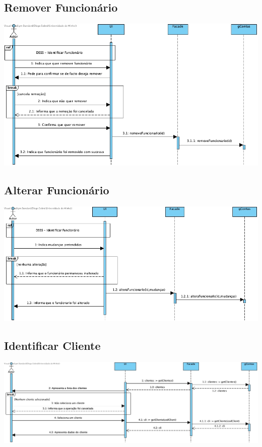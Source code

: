 \subsection{Remover Funcionário}
\begin{center}
 	\includegraphics[width = 5.5in]{DSSS/DSSS-Remover_funcionario.jpg}
\end{center}

\subsection{Alterar Funcionário}
\begin{center}
 	\includegraphics[width = 5.5in]{DSSS/DSSS-Alterar_Funcionario.jpg}
\end{center}

\subsection{Identificar Cliente}
\begin{center}
 	\includegraphics[width = 5.5in]{DSSS/DSSS-Identificar_Cliente.jpg}
\end{center}

